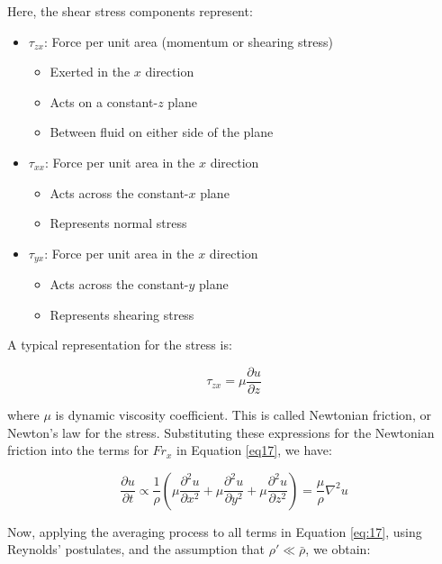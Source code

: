 \documentclass{article}
\begin{document}
Here, the shear stress components represent:
\begin{itemize}
    \item $\tau_{zx}$: Force per unit area (momentum or shearing stress)
    \begin{itemize}
        \item Exerted in the $x$ direction
        \item Acts on a constant-$z$ plane
        \item Between fluid on either side of the plane
    \end{itemize}
    
    \item $\tau_{xx}$: Force per unit area in the $x$ direction
    \begin{itemize}
        \item Acts across the constant-$x$ plane
        \item Represents normal stress
    \end{itemize}
    
    \item $\tau_{yx}$: Force per unit area in the $x$ direction
    \begin{itemize}
        \item Acts across the constant-$y$ plane
        \item Represents shearing stress
    \end{itemize}
\end{itemize}

A typical representation for the stress is:

\begin{equation}
\tau_{zx} = \mu\frac{\partial u}{\partial z}
\label{eq:22}
\end{equation}

where $\mu$ is dynamic viscosity coefficient. This is called Newtonian friction, or Newton's law for the stress. Substituting these expressions for the Newtonian friction into the terms for $Fr_x$ in Equation \ref{eq17}, we have:

\begin{equation}
\frac{\partial u}{\partial t} \propto \frac{1}{\rho}\left(\mu\frac{\partial^2 u}{\partial x^2} + \mu\frac{\partial^2 u}{\partial y^2} + \mu\frac{\partial^2 u}{\partial z^2}\right) = \frac{\mu}{\rho}\nabla^2 u
\label{eq:23}
\end{equation}

Now, applying the averaging process to all terms in Equation \ref{eq:17}, using Reynolds' postulates, and the assumption that $\rho' \ll \bar{\rho}$, we obtain:
\end{document}
